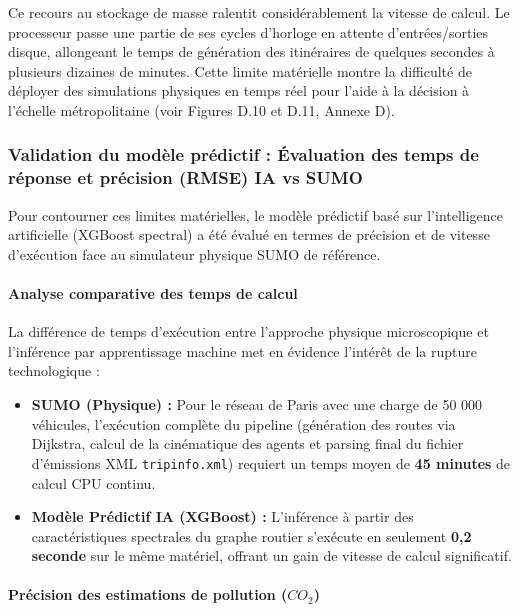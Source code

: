 \documentclass[11pt, a4paper]{article}
\providecommand{\tightlist}{}
\begin{document}
Ce recours au stockage de masse ralentit considérablement la vitesse de
calcul. Le processeur passe une partie de ses cycles d'horloge en
attente d'entrées/sorties disque, allongeant le temps de génération des
itinéraires de quelques secondes à plusieurs dizaines de minutes. Cette
limite matérielle montre la difficulté de déployer des simulations
physiques en temps réel pour l'aide à la décision à l'échelle
métropolitaine (voir Figures D.10 et D.11, Annexe D).

\subsubsection{Validation du modèle prédictif : Évaluation des temps de
réponse et précision (RMSE) IA vs
SUMO}\label{validation-du-moduxe8le-pruxe9dictif-uxe9valuation-des-temps-de-ruxe9ponse-et-pruxe9cision-rmse-ia-vs-sumo}

Pour contourner ces limites matérielles, le modèle prédictif basé sur
l'intelligence artificielle (XGBoost spectral) a été évalué en termes de
précision et de vitesse d'exécution face au simulateur physique SUMO de
référence.

\paragraph{Analyse comparative des temps de
calcul}\label{analyse-comparative-des-temps-de-calcul}

La différence de temps d'exécution entre l'approche physique
microscopique et l'inférence par apprentissage machine met en évidence
l'intérêt de la rupture technologique :

\begin{itemize}
\tightlist
\item
  \textbf{SUMO (Physique) :} Pour le réseau de Paris avec une charge de
  50 000 véhicules, l'exécution complète du pipeline (génération des
  routes via Dijkstra, calcul de la cinématique des agents et parsing
  final du fichier d'émissions XML \texttt{tripinfo.xml}) requiert un
  temps moyen de \textbf{45 minutes} de calcul CPU continu.
\item
  \textbf{Modèle Prédictif IA (XGBoost) :} L'inférence à partir des
  caractéristiques spectrales du graphe routier s'exécute en seulement
  \textbf{0,2 seconde} sur le même matériel, offrant un gain de vitesse
  de calcul significatif.
\end{itemize}

\paragraph{\texorpdfstring{Précision des estimations de pollution
(\(CO_2\))}{Précision des estimations de pollution (CO\_2)}}\label{pruxe9cision-des-estimations-de-pollution-co_2}
\end{document}
